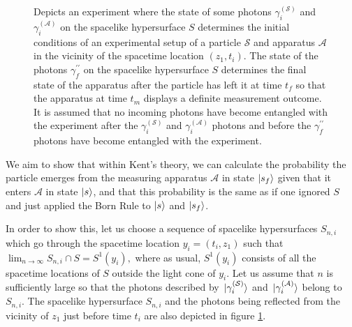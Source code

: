 \begin{figure}[ht!]
	\vspace*{2px}
	\caption{Depicts an experiment where the state of some photons $\gamma_i^{(\mathcal{S})}$ and $\gamma_i^{(\mathcal{A})}$ on the spacelike hypersurface $S$ determines the initial conditions of an experimental setup of a particle $\mathcal{S}$ and apparatus $\mathcal{A}$ in the vicinity of the spacetime location $(z_1, t_i)$. The state of the photons $\gamma_f^{\prime\prime}$ on the spacelike hypersurface $S$ determines the final state of the apparatus after the particle has left it at time $t_f$ so that the apparatus at time $t_m$ displays a definite measurement outcome. It is assumed that no incoming photons have become entangled with the experiment after the $\gamma_i^{(\mathcal{S})}$ and $\gamma_i^{(\mathcal{A})}$ photons and before the $\gamma_f^{\prime\prime}$ photons have become entangled with the experiment.  }
	\label{pisolution}
	\end{figure}


We aim to show that within Kent's theory, we can calculate the probability the particle emerges from the measuring apparatus $\mathcal{A}$ in state $\ket{s_{f}}$ given that it enters $\mathcal{A}$ in state $\ket{s}$, and that this probability is the same as if one ignored $S$ and just applied the Born Rule to $\ket{s}$ and $\ket{s_f}$. 

In order to show this, let us choose a sequence of spacelike hypersurfaces $S_{n,i}$ which go through the spacetime location $y_i=(t_i, z_1)$ such that $\lim_{n\rightarrow\infty} S_{n,i}\cap S=S^1(y_i),$ where as usual,  $S^1(y_i)$ consists of all the spacetime locations of $S$ outside the light cone of $y_i$. Let us assume that $n$ is sufficiently large so that the photons described by $\ket*{\gamma_i^{(\mathcal{S})}}$ and $\ket*{\gamma_i^{(\mathcal{A})}}$ belong to $S_{n,i}$. The spacelike hypersurface $S_{n,i}$ and the photons being reflected from the vicinity of $z_1$ just before time $t_i$ are also depicted in figure \ref{pisolution}.

